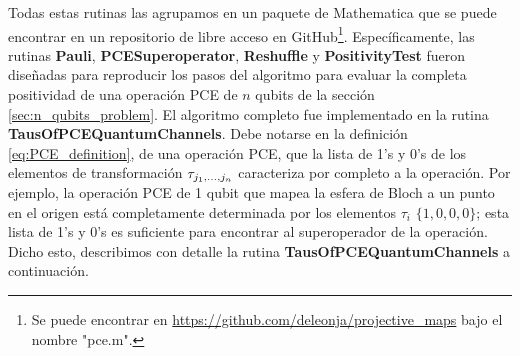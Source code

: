 Todas estas rutinas las agrupamos en un paquete de Mathematica
que se puede encontrar en un repositorio de libre acceso en 
GitHub\footnote{Se puede encontrar en 
\href{https://github.com/deleonja/projective_maps}
{https://github.com/deleonja/projective\_maps} bajo 
el nombre "pce.m".}. Específicamente, las rutinas 
\textbf{Pauli}, \textbf{PCESuperoperator}, \textbf{Reshuffle} y 
\textbf{PositivityTest} fueron diseñadas para reproducir los pasos 
del algoritmo para evaluar la completa positividad de una operación 
PCE de $n$ qubits de la sección \ref{sec:n_qubits_problem}.
El algoritmo completo fue implementado en la rutina 
\textbf{TausOfPCEQuantumChannels}. Debe notarse en la definición 
\eqref{eq:PCE_definition}, de una operación PCE, que la lista de
1's y 0's de los elementos de transformación $\tau_{j_1,\ldots ,j_n}$ caracteriza 
por completo a la operación. Por ejemplo, la operación PCE de 1 qubit 
que mapea la esfera de Bloch a un punto en el origen
está completamente determinada por 
los elementos $\tau_i$ $\{1,0,0,0\}$; esta lista de 
1's y 0's es suficiente para encontrar al superoperador de la operación.
Dicho esto, describimos con detalle la rutina 
\textbf{TausOfPCEQuantumChannels} a continuación.

%

